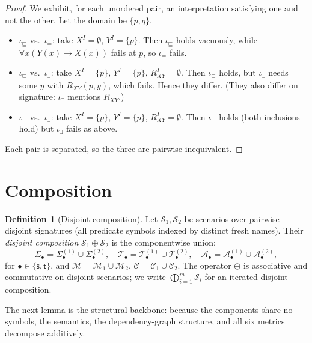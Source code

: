 \documentclass{amsart}
\theoremstyle{definition}
\newtheorem{definition}{Definition}
\newcommand{\Tbox}{\mathcal{T}}
\newcommand{\Abox}{\mathcal{A}}
\newcommand{\Sig}{\Sigma}
\newcommand{\Map}{\mathcal{M}}
\newcommand{\src}{\mathsf{s}}
\newcommand{\trg}{\mathsf{t}}
\newcommand{\Scn}{\mathcal{S}}
\newcommand{\Cor}{\mathcal{C}}
\begin{document}
\begin{proof}
We exhibit, for each unordered pair, an interpretation satisfying one and not the
other. Let the domain be $\{p,q\}$.
\begin{itemize}[nosep]
\item $\iota_{\sqsubseteq}$ vs.\ $\iota_{=}$: take $X^I=\emptyset$, $Y^I=\{p\}$.
Then $\iota_\sqsubseteq$ holds vacuously, while
$\forall x(Y(x)\to X(x))$ fails at $p$, so $\iota_=$ fails.
\item $\iota_{\sqsubseteq}$ vs.\ $\iota_{\exists}$: take $X^I=\{p\}$,
$Y^I=\{p\}$, $R_{XY}^I=\emptyset$. Then $\iota_\sqsubseteq$ holds, but
$\iota_\exists$ needs some $y$ with $R_{XY}(p,y)$, which fails. Hence they differ.
(They also differ on signature: $\iota_\exists$ mentions $R_{XY}$.)
\item $\iota_{=}$ vs.\ $\iota_{\exists}$: take $X^I=\{p\}$, $Y^I=\{p\}$,
$R_{XY}^I=\emptyset$. Then $\iota_=$ holds (both inclusions hold) but
$\iota_\exists$ fails as above.
\end{itemize}
Each pair is separated, so the three are pairwise inequivalent.
\end{proof}

\section{Composition}\label{sec:compose}

\begin{definition}[Disjoint composition]\label{def:compose}
Let $\Scn_1,\Scn_2$ be scenarios over pairwise disjoint signatures (all
predicate symbols indexed by distinct fresh names). Their \emph{disjoint
composition} $\Scn_1\oplus\Scn_2$ is the componentwise union:
\[
\Sig_\bullet=\Sig_\bullet^{(1)}\cup\Sig_\bullet^{(2)},\quad
\Tbox_\bullet=\Tbox_\bullet^{(1)}\cup\Tbox_\bullet^{(2)},\quad
\Abox_\bullet=\Abox_\bullet^{(1)}\cup\Abox_\bullet^{(2)},
\]
for $\bullet\in\{\src,\trg\}$, and $\Map=\Map_1\cup\Map_2$,
$\Cor=\Cor_1\cup\Cor_2$. The operator $\oplus$ is associative and commutative on
disjoint scenarios; we write $\bigoplus_{i=1}^m\Scn_i$ for an iterated disjoint
composition.
\end{definition}

The next lemma is the structural backbone: because the components share no
symbols, the semantics, the dependency-graph structure, and all six metrics
decompose additively.
\end{document}
